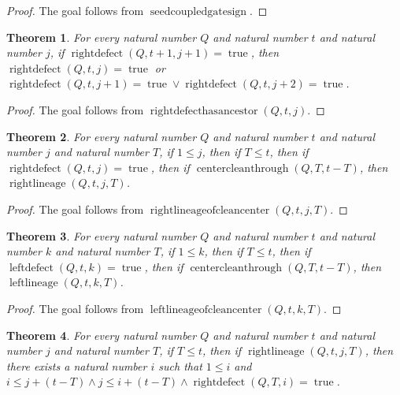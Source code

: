 \documentclass[11pt]{article}
\newtheorem{theorem}{Theorem}[section]
\theoremstyle{definition}
\begin{document}
\begin{proof}
The goal follows from \(\operatorname{seedcoupledgatesign}\).
\end{proof}
\begin{theorem}
\label{ll:observations:right-defect-has-ancestor}
For every natural number \(Q\) and natural number \(t\) and natural number \(j\), if \(\operatorname{rightdefect}(Q, t + 1, j + 1) = \operatorname{true}\), then \(\operatorname{rightdefect}(Q, t, j) = \operatorname{true}\) or \(\operatorname{rightdefect}(Q, t, j + 1) = \operatorname{true} \lor \operatorname{rightdefect}(Q, t, j + 2) = \operatorname{true}\).
\end{theorem}
\begin{proof}
The goal follows from \(\operatorname{rightdefecthasancestor}(Q, t, j)\).
\end{proof}
\begin{theorem}
\label{ll:observations:right-lineage-of-clean-center}
For every natural number \(Q\) and natural number \(t\) and natural number \(j\) and natural number \(T\), if \(1 \le j\), then if \(T \le t\), then if \(\operatorname{rightdefect}(Q, t, j) = \operatorname{true}\), then if \(\operatorname{centercleanthrough}(Q, T, t - T)\), then \(\operatorname{rightlineage}(Q, t, j, T)\).
\end{theorem}
\begin{proof}
The goal follows from \(\operatorname{rightlineageofcleancenter}(Q, t, j, T)\).
\end{proof}
\begin{theorem}
\label{ll:observations:left-lineage-of-clean-center}
For every natural number \(Q\) and natural number \(t\) and natural number \(k\) and natural number \(T\), if \(1 \le k\), then if \(T \le t\), then if \(\operatorname{leftdefect}(Q, t, k) = \operatorname{true}\), then if \(\operatorname{centercleanthrough}(Q, T, t - T)\), then \(\operatorname{leftlineage}(Q, t, k, T)\).
\end{theorem}
\begin{proof}
The goal follows from \(\operatorname{leftlineageofcleancenter}(Q, t, k, T)\).
\end{proof}
\begin{theorem}
\label{ll:observations:right-lineage-at-start}
For every natural number \(Q\) and natural number \(t\) and natural number \(j\) and natural number \(T\), if \(T \le t\), then if \(\operatorname{rightlineage}(Q, t, j, T)\), then there exists a natural number \(i\) such that \(1 \le i\) and \(i \le j + (t - T) \land j \le i + (t - T) \land \operatorname{rightdefect}(Q, T, i) = \operatorname{true}\).
\end{theorem}
\end{document}
